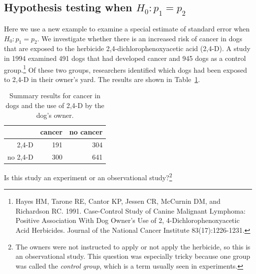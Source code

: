 \textB{\newpage}

\subsection{Hypothesis testing when $H_0: p_1=p_2$}
\label{pooledHTForProportionsSection}


Here we use a new example to examine a special estimate of standard error when $H_0: p_1 = p_2$. We investigate whether there is an increased risk of cancer in dogs that are exposed to the herbicide 2,4-dichlorophenoxyacetic acid (2,4-D). A study in 1994 examined 491 dogs that had developed cancer and 945 dogs as a control group.\footnote{Hayes HM, Tarone RE, Cantor KP, Jessen CR, McCurnin DM, and Richardson RC. 1991. Case-Control Study of Canine Malignant Lymphoma: Positive Association With Dog Owner's Use of 2, 4-Dichlorophenoxyacetic Acid Herbicides. Journal of the National Cancer Institute 83(17):1226-1231.} Of these two groups, researchers identified which dogs had been exposed to 2,4-D in their owner's yard. The results are shown in Table~\ref{24DAndCancerInDogs}.

\begin{table}[h]
\centering
\begin{tabular}{rrr}
  \hline
 & cancer & no cancer \\
  \hline
2,4-D & 191 & 304 \\
no 2,4-D & 300 & 641 \\
   \hline
\end{tabular}
\caption{Summary results for cancer in dogs and the use of 2,4-D by the dog's owner.}
\label{24DAndCancerInDogs}
\end{table}

\begin{exercise}
Is this study an experiment or an observational study?\footnote{The owners were not instructed to apply or not apply the herbicide, so this is an observational study. This question was especially tricky because one group was called the \emph{control group}, which is a term usually seen in experiments.}
\end{exercise}

